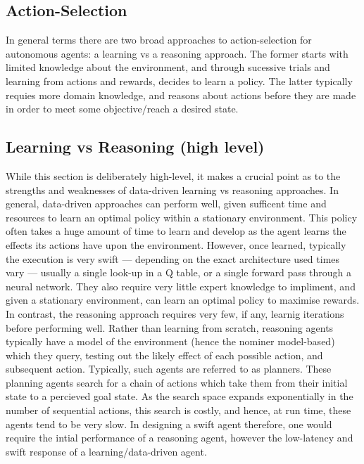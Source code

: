 \subsection{Action-Selection}
In general terms there are two broad approaches to action-selection for autonomous agents: a learning vs a reasoning approach. The former starts with limited knowledge about the environment, and through sucessive trials and learning from actions and rewards, decides to learn a policy. The latter typically requies more domain knowledge, and reasons about actions before they are made in order to meet some objective/reach a desired state. 
\subsection{Learning vs Reasoning (high level)}
While this section is deliberately high-level, it makes a crucial point as to the strengths and weaknesses of data-driven learning vs reasoning approaches. 
In general, data-driven approaches can perform well, given sufficent time and resources to learn an optimal policy within a stationary environment. This policy often takes a huge amount of time to learn and develop as the agent learns the effects its actions have upon the environment. However, once learned, typically the execution is very swift --- depending on the exact architecture used times vary --- usually a single look-up in a Q table, or a single forward pass through a neural network. They also require very little expert knowledge to impliment, and given a stationary environment, can learn an optimal policy to maximise rewards. 
\newline \newline
In contrast, the reasoning approach requires very few, if any, learnig iterations before performing well. Rather than learning from scratch, reasoning agents typically have a model of the environment (hence the nominer model-based) which they query, testing out the likely effect of each possible action, and subsequent action. Typically, such agents are referred to as planners. These planning agents search for a chain of actions which take them from their initial state to a percieved goal state. As the search space expands exponentially in the number of sequential actions, this search is costly, and hence, at run time, these agents tend to be very slow. 
\newline\newline
In designing a swift agent therefore, one would require the intial performance of a reasoning agent, however the low-latency and swift response of a learning/data-driven agent. 
